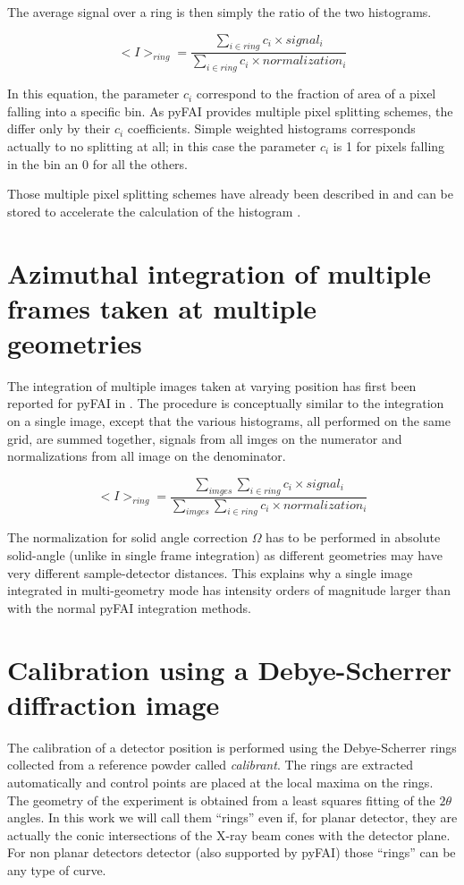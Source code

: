 \documentclass{iucr}              %
\begin{document}
The average signal over a ring is then simply the ratio of the two histograms.

$$
<I>_{ring} = \frac{\sum\limits_{i \in ring} c_i \times signal_i}
                  {\sum\limits_{i \in ring} c_i \times normalization_i} 
$$

In this equation, the parameter $c_i$ correspond to the fraction of area of a
pixel falling into a specific bin. 
As pyFAI provides multiple pixel splitting schemes, the differ only by their
$c_i$ coefficients. 
Simple weighted histograms corresponds actually to no splitting at all; in this
case the parameter $c_i$ is 1 for pixels falling in the bin an 0 for all the
others.
  
Those multiple pixel splitting schemes have already been described in
\cite{fv5028} and can be stored to accelerate the calculation of the
histogram \cite{kieffer_ashiotis-proc-euroscipy-2014}.

\section{Azimuthal integration of multiple frames taken at multiple geometries}

The integration of multiple images taken at varying position has first been
reported for pyFAI in \cite{PyFAI_PDJ}. 
The procedure is conceptually similar to the integration on a single image,
except that the various histograms, all performed on the same grid, are summed
together, signals from all imges on the numerator and normalizations from all
image on the denominator.

$$
<I>_{ring} = \frac{\sum\limits_{imges} \sum\limits_{i \in ring} c_i \times
signal_i} {\sum\limits_{imges} \sum\limits_{i \in ring} c_i \times
normalization_i} 
$$

The normalization for solid angle correction $\Omega$ has to be performed in
absolute solid-angle (unlike in single frame integration) as different
geometries may have very different sample-detector distances. 
This explains why a single image integrated in multi-geometry mode  has
intensity orders of magnitude larger than with the normal pyFAI integration
methods.

\section{Calibration using a Debye-Scherrer diffraction image}

The calibration of a detector position is performed using the Debye-Scherrer
rings collected from a reference powder called \textit{calibrant}.
The rings are extracted automatically and control points are placed at the
local maxima on the rings.
The geometry of the experiment is obtained from a least squares fitting of
the $2\theta$ angles.
In this work we will call them ``rings'' even if, for planar detector,
they are actually the conic intersections of the X-ray beam cones
with the detector plane.
For non planar detectors detector (also supported by pyFAI) those ``rings'' can
be any type of curve.
\end{document}

